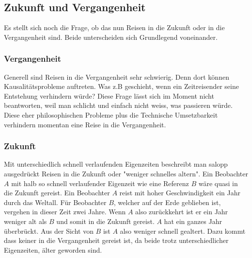 \begin{refsection}
\subsection{Zukunft und Vergangenheit}

Es stellt sich noch die Frage, ob das nun Reisen in die Zukunft oder in die Vergangenheit sind. Beide unterscheiden sich Grundlegend voneinander.

\subsubsection{Vergangenheit}

Generell sind Reisen in die Vergangenheit sehr schwierig. Denn dort können Kausalitätsprobleme auftreten. Was z.B geschieht, wenn ein Zeitreisender seine Entstehung verhindern würde? Diese Frage lässt sich im Moment nicht beantworten, weil man schlicht und einfach nicht weiss, was passieren würde. Diese eher philosophischen Probleme plus die Technische Umsetzbarkeit verhindern momentan eine Reise in die Vergangenheit.

\subsubsection{Zukunft}

Mit unterschiedlich schnell verlaufenden Eigenzeiten beschreibt man salopp ausgedrückt Reisen in die Zukunft oder "weniger schnelles altern". Ein Beobachter $A$ mit halb so schnell verlaufender Eigenzeit wie eine Referenz $B$ wäre quasi in die Zukunft gereist.
Ein Beobachter $A$ reist mit hoher Geschwindigkeit ein Jahr durch das Weltall. Für Beobachter $B$, welcher auf der Erde geblieben ist, vergehen in dieser Zeit zwei Jahre. Wenn $A$ also zurückkehrt ist er ein Jahr weniger alt als $B$ und somit in die Zukunft gereist. $A$ hat ein ganzes Jahr überbrückt. Aus der Sicht von $B$ ist $A$ also weniger schnell gealtert. Dazu kommt dass keiner in die Vergangenheit gereist ist, da beide trotz unterschiedlicher Eigenzeiten, älter geworden sind.



\end{refsection}
